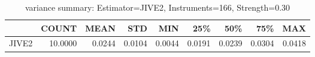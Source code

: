 \begin{table}[ht]
\centering
\caption{variance summary: Estimator=JIVE2, Instruments=166, Strength=0.30}
\begin{tabular}{lrrrrrrrr}
\toprule
 & COUNT & MEAN & STD & MIN & 25\% & 50\% & 75\% & MAX \\
\midrule
JIVE2 & 10.0000 & 0.0244 & 0.0104 & 0.0044 & 0.0191 & 0.0239 & 0.0304 & 0.0418 \\
\bottomrule
\end{tabular}
\end{table}
